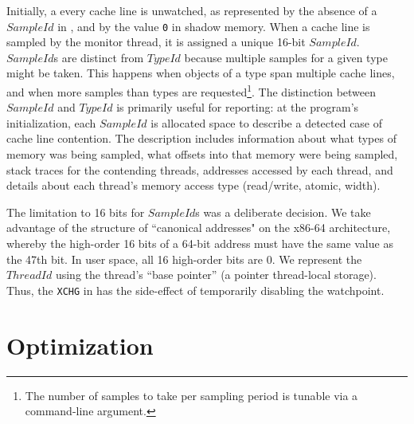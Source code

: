 \documentclass[letterpaper,twocolumn,10pt]{article}
\begin{document}
Initially, a every cache line is unwatched, as represented by the absence of a $SampleId$ in , and by the value
\texttt{0} in shadow memory. When a cache line is sampled by the monitor thread, it is assigned a unique 16-bit $SampleId$. $SampleId$s
are distinct from $TypeId$ because multiple samples for a given type might be taken. This happens when objects of a type span multiple
cache lines, and when more samples than types are requested\footnote{The number of samples to take per sampling period is tunable %
via a command-line argument.}. The distinction between $SampleId$ and $TypeId$ is primarily useful for reporting: at the program's
initialization, each $SampleId$ is allocated space to describe a detected case of cache line contention. The description includes information
about what types of memory was being sampled, what offsets into that memory were being sampled, stack traces for the contending
threads, addresses accessed by each thread, and details about each thread's memory access type (read/write, atomic, width).

The limitation to 16 bits for $SampleId$s was a deliberate decision. We take advantage of the structure of ``canonical addresses" on the
x86-64 architecture, whereby the high-order 16 bits of a 64-bit address must have the same value as the 47th bit. In user space, all 16
high-order bits are 0. We represent the $ThreadId$ using the thread's ``base pointer'' (a pointer thread-local storage). Thus, the
\texttt{XCHG} in  has the side-effect of temporarily disabling the watchpoint.






\section{Optimization}\label{sec:optimizations}
\end{document}
